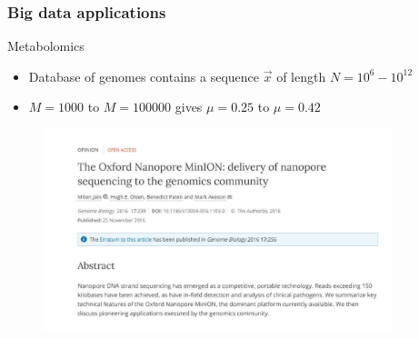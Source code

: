 \documentclass[10pt,xcolor=table]{beamer}
\begin{document}
%
%
\begin{frame}\frametitle{Big data applications}
\begin{block}{Metabolomics}
\begin{itemize}
  \item Database of genomes contains a sequence $\vec{x}$ of length $N=10^{6}-10^{12}$
  \item $M=1000$ to $M = 100000$ gives $\mu = 0.25$ to $\mu = 0.42$
\end{itemize}

  \begin{figure}[h]
  \includegraphics[width=4.0in]{genomebiology.pdf}
  \end{figure}


\end{block}

\end{frame}
\end{document}
